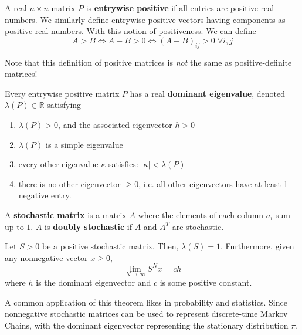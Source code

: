   \begin{definition}
    A real $n \times n$ matrix $P$ is \textbf{entrywise positive} if all entries are positive real numbers. We similarly define entrywise positive vectors having components as positive real numbers. With this notion of positiveness. We can define
    \begin{equation}
      A > B \iff A - B > 0 \iff (A-B)_{i j} > 0 \; \forall i, j
    \end{equation}
  \end{definition}

  Note that this definition of positive matrices is \textit{not} the same as positive-definite matrices! 

  \begin{theorem}
    Every entrywise positive matrix $P$ has a real \textbf{dominant eigenvalue}, denoted $\lambda(P) \in \mathbb{R}$ satisfying
    \begin{enumerate}
      \item $\lambda(P) > 0$, and the associated eigenvector $h >0$
      \item $\lambda(P)$ is a simple eigenvalue
      \item every other eigenvalue $\kappa$ satisfies: $|\kappa| < \lambda(P)$
      \item there is no other eigenvector $\geq 0$, i.e. all other eigenvectors have at least 1 negative entry.
    \end{enumerate}
  \end{theorem}

  \begin{definition}
    A \textbf{stochastic matrix} is a matrix $A$ where the elements of each column $a_i$ sum up to $1$. $A$ is \textbf{doubly stochastic} if $A$ and $A^T$ are stochastic. 
  \end{definition}

  \begin{theorem}
    Let $S > 0$ be a positive stochastic matrix. Then, $\lambda(S) = 1$. Furthermore, given any nonnegative vector $x \geq 0$, 
    \begin{equation}
      \lim_{N \rightarrow \infty} S^N x = c h
    \end{equation}
    where $h$ is the dominant eigenvector and $c$ is some positive constant. 
  \end{theorem}

  A common application of this theorem likes in probability and statistics. Since nonnegative stochastic matrices can be used to represent discrete-time Markov Chains, with the dominant eigenvector representing the stationary distribution $\pi$. 


